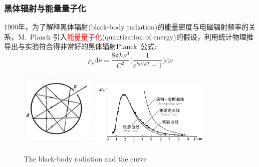 %
\frame
{
	\frametitle{黑体辐射与能量量子化}
	\textrm{1900}年，为了解释黑体辐射\textrm{(black-body radiation)}的能量密度与电磁辐射频率的关系，\textrm{M.~Planck}%
	引入\textcolor{red}{能量量子化}\textrm{(quantization of energy)}的假设，利用统计物理推导出与实验符合得非常好的黑体辐射\textrm{Planck~}公式:~
	\begin{displaymath}
		\rho_{\nu}\mathrm{d}{\nu}=\dfrac{8{\pi}h{\nu}^3}{C^2}\bigg(\dfrac1{\mathrm{e}^{h\nu/kT}-1}\bigg)\mathrm{d}\nu
	\end{displaymath}
\begin{figure}[h!]
\centering
\vspace{-10.5pt}
\includegraphics[height=1.45in,width=1.45in,viewport=0 0 136 136,clip]{Figures/Black_box.jpg}
\hskip 1pt
\includegraphics[height=1.32in,width=2.25in,viewport=0 0 390 215,clip]{Figures/Black_box_curve.png}
\caption{\textrm{The black-body radiation and the curve}}
\label{Black_box}
\end{figure}
}

